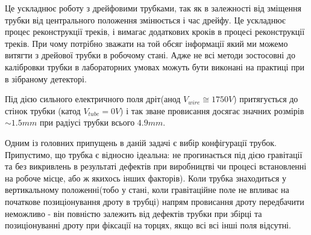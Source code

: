 \documentclass[]{article}
\begin{document}
	Це ускладнює роботу з дрейфовими трубками, так як в залежності від зміщення трубки від центрального положення змінюється і час дрейфу. Це ускладнює процес реконструкції треків, і вимагає додаткових кроків в процесі реконструкції треків. При чому потрібно зважати на той обсяг інформації який ми можемо витягти з дрейової трубки в робочому стані. Адже не всі методи зостосовні до калібровки трубки в лабораторних умовах можуть бути виконані на практиці при в зібраному детекторі.
	
	Під дією сильного електричного поля дріт(анод $V_{wire}\cong1750 V$) притягується до стінок трубки (катод $V_{tube}=0V$) і так зване провисання досягає значних розмірів $\sim1.5mm$ при радіусі трубки всього $4.9 mm$. 

	Одним із головних припущень в даній задачі є вибір конфігурації трубок. Припустимо, що трубка є відносно ідеальна: не прогинається під дією гравітації та без викривлень в результаті дефектів при виробництві чи процесі встановленні на робоче місце, або ж якихось інших факторів). Коли трубка знаходиться у вертикальному положенні(тобо у стані, коли гравітаційне поле не впливає на початкове позиціонування дроту в трубці) напрям провисання дроту передбачити неможливо - він повністю залежить від дефектів трубки при збірці та позиціонуванні дроту при фіксації на торцях, якщо всі всі інші поля відсутні.
	
\end{document}
